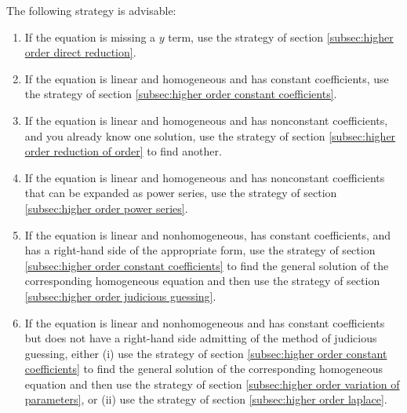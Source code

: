 \documentclass{myart}
\begin{document}
The following strategy is advisable:
\begin{enumerate}
\item If the equation is missing a $y$ term, use the strategy of
  section \ref{subsec:higher order direct reduction}.
\item If the equation is linear and homogeneous and has constant
  coefficients, use the strategy of section \ref{subsec:higher order
    constant coefficients}.
\item If the equation is linear and homogeneous and has nonconstant
  coefficients, and you already know one solution, use the strategy of
  section \ref{subsec:higher order reduction of order} to find
  another.
\item If the equation is linear and homogeneous and has nonconstant
  coefficients that can be expanded as power series, use the strategy
  of section \ref{subsec:higher order power series}.
\item If the equation is linear and nonhomogeneous, has constant
  coefficients, and has a right-hand side of the appropriate form, use
  the strategy of section \ref{subsec:higher order constant
    coefficients} to find the general solution of the corresponding
  homogeneous equation and then use the strategy of section
  \ref{subsec:higher order judicious guessing}.
\item If the equation is linear and nonhomogeneous and has constant
  coefficients but does not have a right-hand side admitting of the
  method of judicious guessing, either (i) use the strategy of section
  \ref{subsec:higher order constant coefficients} to find the general
  solution of the corresponding homogeneous equation and then use the
  strategy of section \ref{subsec:higher order variation of
    parameters}, or (ii) use the strategy of section
  \ref{subsec:higher order laplace}.
\end{enumerate}
\end{document}
